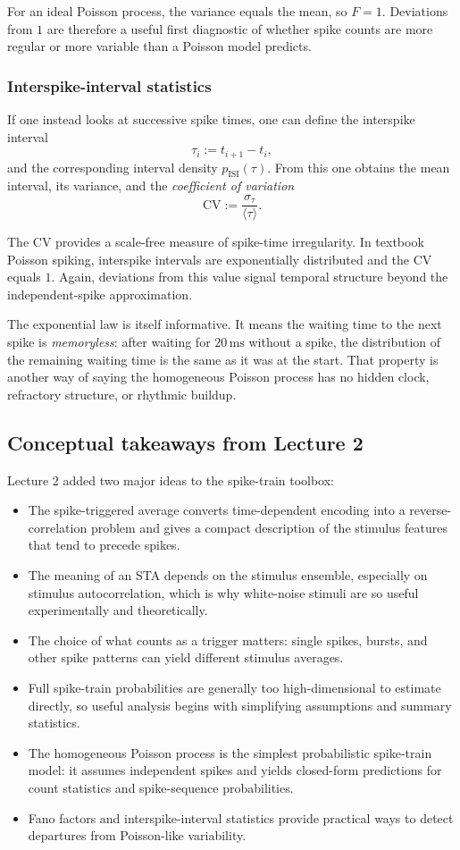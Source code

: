 \documentclass[11pt]{article}
\begin{document}
For an ideal Poisson process, the variance equals the mean, so $F=1$. Deviations from $1$ are therefore a useful first diagnostic of whether spike counts are more regular or more variable than a Poisson model predicts.

\subsubsection{Interspike-interval statistics}

If one instead looks at successive spike times, one can define the interspike interval
\[
\tau_i := t_{i+1}-t_i,
\]
and the corresponding interval density $p_{\mathrm{ISI}}(\tau)$. From this one obtains the mean interval, its variance, and the \emph{coefficient of variation}
\[
\mathrm{CV} := \frac{\sigma_\tau}{\langle \tau \rangle}.
\]

The CV provides a scale-free measure of spike-time irregularity. In textbook Poisson spiking, interspike intervals are exponentially distributed and the CV equals $1$. Again, deviations from this value signal temporal structure beyond the independent-spike approximation.

The exponential law is itself informative. It means the waiting time to the next spike is \emph{memoryless}: after waiting for $20\,\mathrm{ms}$ without a spike, the distribution of the remaining waiting time is the same as it was at the start. That property is another way of saying the homogeneous Poisson process has no hidden clock, refractory structure, or rhythmic buildup.

\subsection{Conceptual takeaways from Lecture 2}

Lecture 2 added two major ideas to the spike-train toolbox:
\begin{itemize}
    \item The spike-triggered average converts time-dependent encoding into a reverse-correlation problem and gives a compact description of the stimulus features that tend to precede spikes.
    \item The meaning of an STA depends on the stimulus ensemble, especially on stimulus autocorrelation, which is why white-noise stimuli are so useful experimentally and theoretically.
    \item The choice of what counts as a trigger matters: single spikes, bursts, and other spike patterns can yield different stimulus averages.
    \item Full spike-train probabilities are generally too high-dimensional to estimate directly, so useful analysis begins with simplifying assumptions and summary statistics.
    \item The homogeneous Poisson process is the simplest probabilistic spike-train model: it assumes independent spikes and yields closed-form predictions for count statistics and spike-sequence probabilities.
    \item Fano factors and interspike-interval statistics provide practical ways to detect departures from Poisson-like variability.
\end{itemize}
\end{document}
